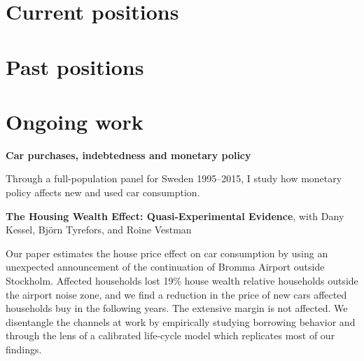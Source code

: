 \documentclass{clean_cv}
\begin{document}
\section{Current positions}

\begin{datetabular}{6em}

\end{datetabular}

\section{Past positions}
\begin{datetabular}{6em}
\end{datetabular}


\section{Ongoing work}

\textbf{Car purchases, indebtedness and monetary policy}

Through a full-population panel for Sweden 1995--2015, I study how monetary policy affects new and used car consumption.

\medskip

\textbf{The Housing Wealth Effect: Quasi-Experimental Evidence}, with Dany Kessel, Björn Tyrefors, and Roine Vestman

Our paper estimates the house price effect on car consumption by using an unexpected announcement of the continuation of Bromma Airport outside Stockholm. Affected households lost 19\% house wealth relative households outside the airport noise zone, and we find a reduction in the price of new cars affected households buy in the following years. The extensive margin is not affected. We disentangle the channels at work by empirically studying borrowing behavior and through the lens of a calibrated life-cycle model which replicates most of our findings.

\medskip
\end{document}
